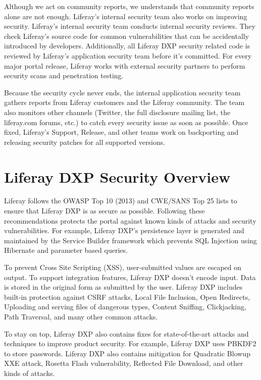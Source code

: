 Although we act on community reports, we understands that community
reports alone are not enough. Liferay's internal security team also
works on improving security. Liferay's internal security team conducts
internal security reviews. They check Liferay's source code for common
vulnerabilities that can be accidentally introduced by developers.
Additionally, all Liferay DXP security related code is reviewed by
Liferay's application security team before it's committed. For every
major portal release, Liferay works with external security partners to
perform security scans and penetration testing.

Because the security cycle never ends, the internal application security
team gathers reports from Liferay customers and the Liferay community.
The team also monitors other channels (Twitter, the full disclosure
mailing list, the liferay.com forums, etc.) to catch every security
issue as soon as possible. Once fixed, Liferay's Support, Release, and
other teams work on backporting and releasing security patches for all
supported versions.

\section{Liferay DXP Security
Overview}\label{liferay-dxp-security-overview}

Liferay follows the OWASP Top 10 (2013) and CWE/SANS Top 25 lists to
ensure that Liferay DXP is as secure as possible. Following these
recommendations protects the portal against known kinds of attacks and
security vulnerabilities. For example, Liferay DXP's persistence layer
is generated and maintained by the Service Builder framework which
prevents SQL Injection using Hibernate and parameter based queries.

To prevent Cross Site Scripting (XSS), user-submitted values are escaped
on output. To support integration features, Liferay DXP doesn't encode
input. Data is stored in the original form as submitted by the user.
Liferay DXP includes built-in protection against CSRF attacks, Local
File Inclusion, Open Redirects, Uploading and serving files of dangerous
types, Content Sniffing, Clickjacking, Path Traversal, and many other
common attacks.

To stay on top, Liferay DXP also contains fixes for state-of-the-art
attacks and techniques to improve product security. For example, Liferay
DXP uses PBKDF2 to store passwords. Liferay DXP also contains mitigation
for Quadratic Blowup XXE attack, Rosetta Flash vulnerability, Reflected
File Download, and other kinds of attacks.


